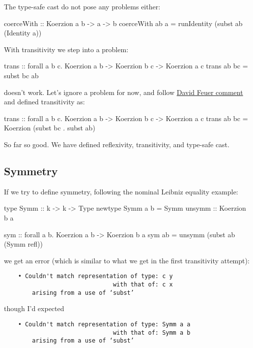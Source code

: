 The type-safe cast do not pose any problems either:

\begin{code}
coerceWith :: Koerzion a b -> a -> b
coerceWith ab a = runIdentity (subst ab (Identity a))
\end{code}

With transitivity we step into a problem:

\begin{code}
trans :: forall a b c. Koerzion a b -> Koerzion b c -> Koerzion a c
trans ab bc = subst bc ab
\end{code}

doesn't work. Let's ignore a problem for now,
and follow \href{https://www.reddit.com/r/haskell/comments/pjkog2/leibniz_equality_in_haskell_part_1/hbxy77x?utm_source=share&utm_medium=web2x&context=3}{David Feuer comment}
and defined transitivity as:
\begin{code}
trans :: forall a b c. Koerzion a b -> Koerzion b c -> Koerzion a c
trans ab bc = Koerzion (subst bc . subst ab)
\end{code}

So far so good. We have defined reflexivity, transitivity, and type-safe cast.

\subsection{Symmetry}

If we try to define symmetry, following the nominal Leibniz equality
example:

\begin{code}
type Symm :: k -> k -> Type
newtype Symm a b = Symm { unsymm :: Koerzion b a }

sym :: forall a b. Koerzion a b -> Koerzion b a
sym ab = unsymm (subst ab (Symm refl))
\end{code}

we get an error (which is similar to what we get in the first transitivity attempt):

\begin{verbatim}
    • Couldn't match representation of type: c y
                               with that of: c x
        arising from a use of ‘subst’
\end{verbatim}

though I'd expected

\begin{verbatim}
    • Couldn't match representation of type: Symm a a
                               with that of: Symm a b
        arising from a use of ‘subst’
\end{verbatim}

